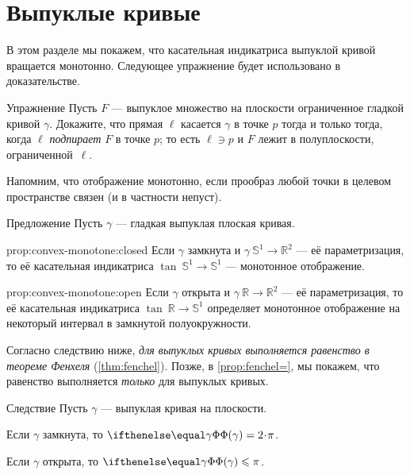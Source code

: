 \section{Выпуклые кривые}

В этом разделе мы покажем, что касательная индикатриса выпуклой кривой вращается монотонно.
Следующее упражнение будет использовано в доказательстве.

\begin{thm}{Упражнение}\label{ex:tangent-support}
Пусть $F$ --- выпуклое множество на плоскости ограниченное гладкой кривой $\gamma$.
Докажите, что прямая $\ell$ касается $\gamma$ в точке $p$ тогда и только тогда, когда $\ell$ \emph{подпирает} $F$ в точке $p$;
то есть $\ell\ni p$ и $F$ лежит в полуплоскости, ограниченной~$\ell$.
\end{thm}

Напомним, что отображение монотонно, если прообраз любой точки в целевом пространстве связен (и в частности непуст).

\begin{thm}{Предложение}\label{prop:convex-monotone}
Пусть $\gamma$ --- гладкая выпуклая плоская кривая.

\begin{subthm}{prop:convex-monotone:closed}
Если $\gamma$ замкнута и $\gamma\:\mathbb{S}^1\to \mathbb{R}^2$ --- её параметризация, то её касательная индикатриса $\tan\:\mathbb{S}^1\to \mathbb{S}^1$ --- монотонное отображение.
\end{subthm}

\begin{subthm}{prop:convex-monotone:open}
Если $\gamma$ открыта и $\gamma\:\mathbb{R}\to \mathbb{R}^2$ --- её параметризация, то её касательная индикатриса $\tan\:\mathbb{R}\to\mathbb{S}^1$ определяет монотонное отображение на некоторый интервал в замкнутой полуокружности.
\end{subthm}

\end{thm}

Согласно следствию ниже, \textit{для выпуклых кривых выполняется равенство в теореме Фенхеля} (\ref{thm:fenchel}).
Позже, в \ref{prop:fenchel=}, мы покажем, что равенство выполняется \textit{только} для выпуклых кривых.

\begin{thm}{Следствие}\label{cor:fenchel=convex}
Пусть $\gamma$ --- выпуклая кривая на плоскости.

\begin{subthm}{}
Если $\gamma$ замкнута, то $\tc\gamma=2\cdot\pi$.
\end{subthm}

\begin{subthm}{}
Если $\gamma$ открыта, то $\tc\gamma\le\pi$.
\end{subthm}

\end{thm}

